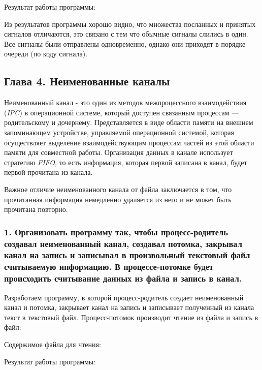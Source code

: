 \documentclass[14pt,a4paper,report]{report}
\begin{document}
Результат работы программы:



Из результатов программы хорошо видно, что множества посланных и принятых сигналов отличаются, это связано с тем что обычные сигналы слились в один. Все сигналы были отправлены одновременно, однако они приходят в порядке очереди (по коду сигнала).

\subsection{Глава 4. Неименованные каналы}

Неименованный канал - это один из методов межпроцессного взаимодействия (\emph{IPC}) в операционной системе, который доступен связанным процессам — родительскому и дочернему. Представляется в виде области памяти на внешнем запоминающем устройстве, управляемой операционной системой, которая осуществляет выделение взаимодействующим процессам частей из этой области памяти для совместной работы. Организация данных в канале использует стратегию \emph{FIFO}, то есть информация, которая первой записана в канал, будет первой прочитана из канала.

Важное отличие неименованного канала от файла заключается в том, что прочитанная информация немедленно удаляется из него и не может быть прочитана повторно. 

\subsubsection{1.  Организовать программу так, чтобы процесс-родитель создавал неименованный канал, создавал потомка, закрывал канал на запись и записывал в произвольный текстовый файл считываемую информацию. В процессе-потомке будет происходить считывание данных из файла и запись в канал.}

Разработаем программу, в которой процесс-родитель создает неименованный канал и потомка, закрывает канал на запись и записывает полученный из канала текст в текстовый файл. Процесс-потомок производит чтение из файла и запись в файл:



Содержимое файла для чтения:



Результат работы программы:


\end{document}
